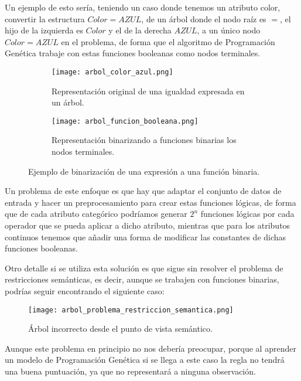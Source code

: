Un ejemplo de esto sería, teniendo un caso donde tenemos un atributo color, convertir la estructura $Color = AZUL$, de un árbol donde el nodo raíz es $=$, el hijo de la izquierda es $Color$ y el de la derecha $AZUL$, a un único nodo $Color = AZUL$ en el problema, de forma que el algoritmo de Programación Genética trabaje con estas funciones booleanas como nodos terminales.

\begin{figure}[H]
    \centering
	 \begin{subfigure}[b]{0.49\textwidth}
		 \centering
		 \texttt{[image: arbol\_color\_azul.png]}
		 \caption{Representación original de una igualdad expresada en un árbol.}
		 \label{fig:arbol_color_azul}
	 \end{subfigure}
	 \begin{subfigure}[b]{0.49\textwidth}
		 \centering
		\texttt{[image: arbol\_funcion\_booleana.png]}
		\caption{Representación binarizando a funciones binarias los nodos terminales.}
		\label{fig:arbol_funcion_booleana}
   \end{subfigure}
	\caption{Ejemplo de binarización de una expresión a una función binaria.}
	\label{fig:arbol_exp_a_funcion_booleana}
\end{figure}


Un problema de este enfoque es que hay que adaptar el conjunto de datos de entrada y hacer un preprocesamiento para crear estas funciones lógicas, de forma que de cada atributo categórico podríamos generar $2^n$ funciones lógicas por cada operador que se pueda aplicar a dicho atributo, mientras que para los atributos continuos tenemos que añadir una forma de modificar las constantes de dichas funciones booleanas.

Otro detalle si se utiliza esta solución es que sigue sin resolver el problema de restricciones semánticas, es decir, aunque se trabajen con funciones binarias, podrías seguir encontrando el siguiente caso:

\begin{figure}[H]
    \centering
	  \texttt{[image: arbol\_problema\_restriccion\_semantica.png]}
    \caption{Árbol incorrecto desde el punto de vista semántico.}
	 \label{fig:arbol_problema_restriccion_semantica}
\end{figure}

Aunque este problema en principio no nos debería preocupar, porque al aprender un modelo de Programación Genética si se llega a este caso la regla no tendrá una buena puntuación, ya que no representará a ninguna observación.

